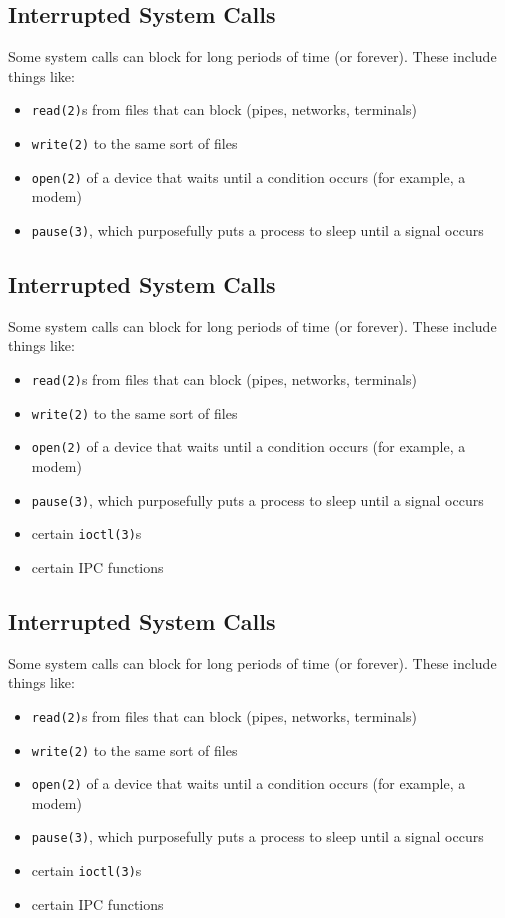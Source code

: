 \documentclass[xga]{xdvislides}
\begin{document}
\subsection{Interrupted System Calls}

Some system calls can block for long periods of time (or forever). These
include things like:

\begin{itemize}
	\item {\tt read(2)}s from files that can block (pipes, networks, terminals)
	\item {\tt write(2)} to the same sort of files
	\item {\tt open(2)} of a device that waits until a condition occurs (for example, a modem)
	\item {\tt pause(3)}, which purposefully puts a process to sleep until a signal occurs
\end{itemize}

\subsection{Interrupted System Calls}

Some system calls can block for long periods of time (or forever). These
include things like:

\begin{itemize}
	\item {\tt read(2)}s from files that can block (pipes, networks, terminals)
	\item {\tt write(2)} to the same sort of files
	\item {\tt open(2)} of a device that waits until a condition occurs (for example, a modem)
	\item {\tt pause(3)}, which purposefully puts a process to sleep until a signal occurs
	\item certain {\tt ioctl(3)}s
	\item certain IPC functions
\end{itemize}


\subsection{Interrupted System Calls}

Some system calls can block for long periods of time (or forever). These
include things like:

\begin{itemize}
	\item {\tt read(2)}s from files that can block (pipes, networks, terminals)
	\item {\tt write(2)} to the same sort of files
	\item {\tt open(2)} of a device that waits until a condition occurs (for example, a modem)
	\item {\tt pause(3)}, which purposefully puts a process to sleep until a signal occurs
	\item certain {\tt ioctl(3)}s
	\item certain IPC functions
\end{itemize}
\end{document}
